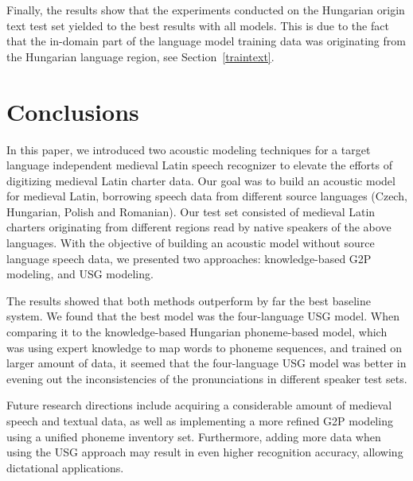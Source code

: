 \documentclass[runningheads,a4paper]{llncs}
\begin{document}
Finally, the results show that the experiments conducted on the Hungarian origin text test set yielded to the best results with all models.
This is due to the fact that the in-domain part of the language model training data was originating from the Hungarian language region, see Section~\ref{traintext}.
\section{Conclusions}
In this paper, we introduced two acoustic modeling techniques for a target language independent medieval Latin speech recognizer to elevate the efforts of digitizing medieval Latin charter data.
Our goal was to build an acoustic model for medieval Latin, borrowing speech data from different source languages (Czech, Hungarian, Polish and Romanian).
Our test set consisted of medieval Latin charters originating from different regions read by native speakers of the above languages.
With the objective of building an acoustic model without source language speech data, we presented two approaches: knowledge-based G2P modeling, and USG modeling.

The results showed that both methods outperform by far the best baseline system. 
We found that the best model was the four-language USG model.
When comparing it to the knowledge-based Hungarian phoneme-based model, which was using expert knowledge to map words to phoneme sequences, and trained on larger amount of data, it seemed that the four-language USG model was better in evening out the inconsistencies of the pronunciations in different speaker test sets.

Future research directions include acquiring a considerable amount of medieval speech and textual data, as well as implementing a more refined G2P modeling using a unified phoneme inventory set.
Furthermore, adding more data when using the USG approach may result in even higher recognition accuracy, allowing dictational applications.



\end{document}
